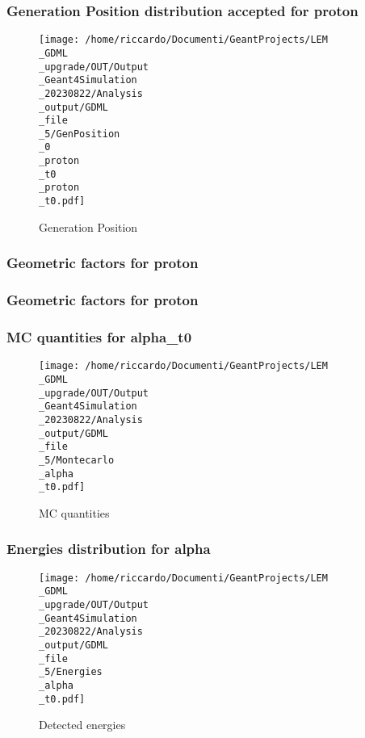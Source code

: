 \documentclass[8pt]{beamer}
\begin{document}
            \begin{frame}
                \frametitle{Generation Position distribution accepted for proton}
            
        \begin{figure}[h]
            \centering
            \texttt{[image: /home/riccardo/Documenti/GeantProjects/LEM\\\_GDML\\\_upgrade/OUT/Output\\\_Geant4Simulation\\\_20230822/Analysis\\\_output/GDML\\\_file\\\_5/GenPosition\\\_0\\\_proton\\\_t0\\\_proton\\\_t0.pdf]}
            \caption{Generation Position}
        \end{figure}
        
            \end{frame}
            
            \begin{frame}
                \frametitle{Geometric factors for proton}
            
            \end{frame}
            
            \begin{frame}
                \frametitle{Geometric factors for proton}
            
            \end{frame}
            
            \begin{frame}
                \frametitle{MC quantities for alpha\_t0}
            
        \begin{figure}[h]
            \centering
            \texttt{[image: /home/riccardo/Documenti/GeantProjects/LEM\\\_GDML\\\_upgrade/OUT/Output\\\_Geant4Simulation\\\_20230822/Analysis\\\_output/GDML\\\_file\\\_5/Montecarlo\\\_alpha\\\_t0.pdf]}
            \caption{MC quantities}
        \end{figure}
        
            \end{frame}
            
            \begin{frame}
                \frametitle{Energies distribution for alpha}
            
        \begin{figure}[h]
            \centering
            \texttt{[image: /home/riccardo/Documenti/GeantProjects/LEM\\\_GDML\\\_upgrade/OUT/Output\\\_Geant4Simulation\\\_20230822/Analysis\\\_output/GDML\\\_file\\\_5/Energies\\\_alpha\\\_t0.pdf]}
            \caption{Detected energies}
        \end{figure}
        
            \end{frame}
            
\end{document}
